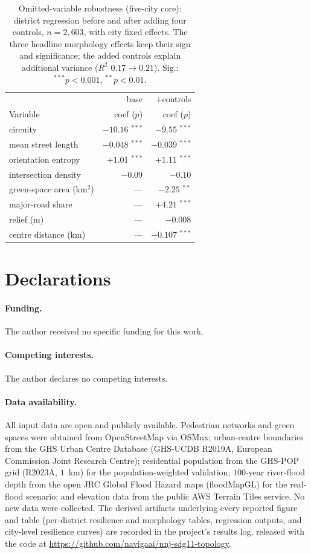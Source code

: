 \begin{table}[t]\centering
\caption{Omitted-variable robustness (five-city core): district regression before and
after adding four controls, $n=2{,}603$, with city fixed effects. The three headline
morphology effects keep their sign and significance; the added controls explain
additional variance ($R^2$ $0.17\to0.21$). Sig.: $^{***}p<0.001$, $^{**}p<0.01$.}
\label{tab:controls}
\begin{tabular}{lrr}
\toprule
& base & $+$controls\\
Variable & coef ($p$) & coef ($p$)\\
\midrule
circuity & $-10.16$ $^{***}$ & $-9.55$ $^{***}$\\
mean street length & $-0.048$ $^{***}$ & $-0.039$ $^{***}$\\
orientation entropy & $+1.01$ $^{***}$ & $+1.11$ $^{***}$\\
intersection density & $-0.09$ & $-0.10$\\
\midrule
green-space area (km$^2$) & --- & $-2.25$ $^{**}$\\
major-road share & --- & $+4.21$ $^{***}$\\
relief (m) & --- & $-0.008$\\
centre distance (km) & --- & $-0.107$ $^{***}$\\
\bottomrule
\end{tabular}
\end{table}


\section*{Declarations}

\paragraph{Funding.} The author received no specific funding for this work.

\paragraph{Competing interests.} The author declares no competing interests.

\paragraph{Data availability.} All input data are open and publicly available.
Pedestrian networks and green spaces were obtained from OpenStreetMap via
OSMnx; urban-centre boundaries from the GHS Urban Centre Database (GHS-UCDB
R2019A, European Commission Joint Research Centre); residential population from the
GHS-POP grid (R2023A, $1$~km) for the population-weighted validation; $100$-year
river-flood depth from the open JRC Global Flood Hazard maps (floodMapGL) for the
real-flood scenario; and elevation data from the public AWS Terrain Tiles service. No new data were collected. The derived
artifacts underlying every reported figure and table (per-district resilience and
morphology tables, regression outputs, and city-level resilience curves) are
recorded in the project's results log, released with the code at
\url{https://github.com/navigaai/nnj-sdg11-topology}.

